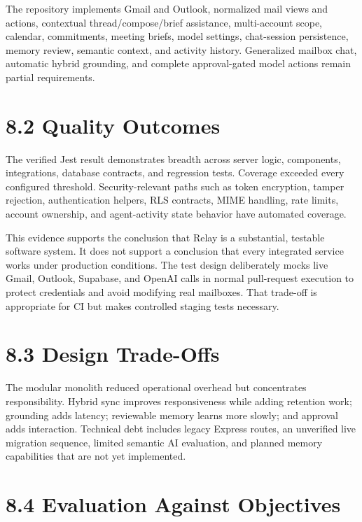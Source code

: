 \documentclass[
]{report}
\begin{document}
The repository implements Gmail and Outlook, normalized mail views and
actions, contextual thread/compose/brief assistance, multi-account
scope, calendar, commitments, meeting briefs, model settings,
chat-session persistence, memory review, semantic context, and activity
history. Generalized mailbox chat, automatic hybrid grounding, and
complete approval-gated model actions remain partial requirements.

\section{8.2 Quality Outcomes}\label{82-quality-outcomes}

The verified Jest result demonstrates breadth across server logic,
components, integrations, database contracts, and regression tests.
Coverage exceeded every configured threshold. Security-relevant paths
such as token encryption, tamper rejection, authentication helpers, RLS
contracts, MIME handling, rate limits, account ownership, and
agent-activity state behavior have automated coverage.

This evidence supports the conclusion that Relay is a substantial,
testable software system. It does not support a conclusion that every
integrated service works under production conditions. The test design
deliberately mocks live Gmail, Outlook, Supabase, and OpenAI calls in
normal pull-request execution to protect credentials and avoid modifying
real mailboxes. That trade-off is appropriate for CI but makes
controlled staging tests necessary.

\section{8.3 Design Trade-Offs}\label{83-design-trade-offs}

The modular monolith reduced operational overhead but concentrates
responsibility. Hybrid sync improves responsiveness while adding
retention work; grounding adds latency; reviewable memory learns more
slowly; and approval adds interaction. Technical debt includes legacy
Express routes, an unverified live migration sequence, limited semantic
AI evaluation, and planned memory capabilities that are not yet
implemented.

\section{8.4 Evaluation Against
Objectives}\label{84-evaluation-against-objectives}
\end{document}
